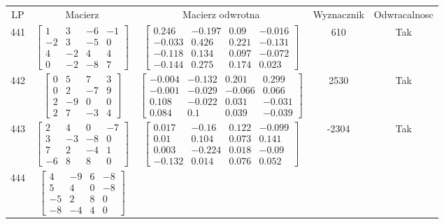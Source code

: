 \documentclass[a4paper,12pt]{article}
\begin{document}
\bgroup {} \vspace{0.2in} \begin{tabular}{c c c c c}
LP & Macierz & Macierz odwrotna & Wyznacznik & Odwracalnosc\\
441
&
$\begin{bmatrix} 1 & 3 & -6 & -1 \\ -2 & 3 & -5 & 0 \\ 4 & -2 & 4 & 4 \\ 0 & -2 & -8 & 7 \end{bmatrix}$
&
$\begin{bmatrix} 0.246 & -0.197 & 0.09 & -0.016 \\ -0.033 & 0.426 & 0.221 & -0.131 \\ -0.118 & 0.134 & 0.097 & -0.072 \\ -0.144 & 0.275 & 0.174 & 0.023 \end{bmatrix}$
&
610
&
Tak
\\
442
&
$\begin{bmatrix} 0 & 5 & 7 & 3 \\ 0 & 2 & -7 & 9 \\ 2 & -9 & 0 & 0 \\ 2 & 7 & -3 & 4 \end{bmatrix}$
&
$\begin{bmatrix} -0.004 & -0.132 & 0.201 & 0.299 \\ -0.001 & -0.029 & -0.066 & 0.066 \\ 0.108 & -0.022 & 0.031 & -0.031 \\ 0.084 & 0.1 & 0.039 & -0.039 \end{bmatrix}$
&
2530
&
Tak
\\
443
&
$\begin{bmatrix} 2 & 4 & 0 & -7 \\ 3 & -3 & -8 & 0 \\ 7 & 2 & -4 & 1 \\ -6 & 8 & 8 & 0 \end{bmatrix}$
&
$\begin{bmatrix} 0.017 & -0.16 & 0.122 & -0.099 \\ 0.01 & 0.104 & 0.073 & 0.141 \\ 0.003 & -0.224 & 0.018 & -0.09 \\ -0.132 & 0.014 & 0.076 & 0.052 \end{bmatrix}$
&
-2304
&
Tak
\\
444
&
$\begin{bmatrix} 4 & -9 & 6 & -8 \\ 5 & 4 & 0 & -8 \\ -5 & 2 & 8 & 0 \\ -8 & -4 & 4 & 0 \end{bmatrix}$

\end{tabular}
\end{document}

